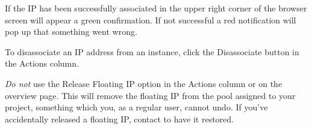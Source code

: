 If the IP has been successfully associated in the upper right corner of the browser screen will appear a green confirmation. If not successful a red notification will pop up that something went wrong.

 To disassociate an IP address from an instance, click
the Disassociate button in the Actions column.

 \emph{Do not} use the Release Floating IP option in
the Actions column or on the overview page.  This will remove the
floating IP from the pool assigned to your project, something which
you, as a regular user, cannot undo.  If you've accidentally released
a floating IP, contact \cloudinfo to have it restored.

